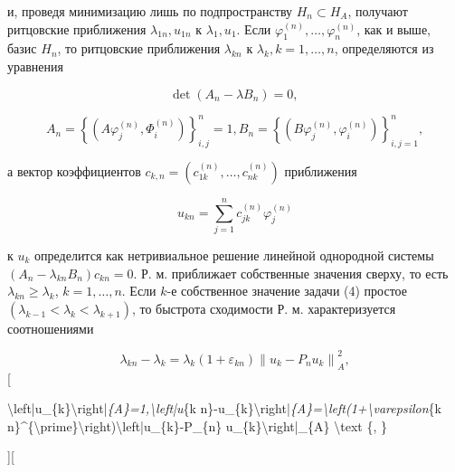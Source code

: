 \documentclass[10pt]{article}
\begin{document}
и, проведя минимизацию лишь по подпространству $H_{n} \subset H_{A}$, получают ритцовские приближения $\lambda_{1 n}, u_{1 n}$ к $\lambda_{1}, u_{1}$. Если $\varphi_{1}^{(n)}, \ldots, \varphi_{n}^{(n)}$, как и выше, базис $H_{n}$, то ритцовские приближения $\lambda_{k n}$ к $\lambda_{k}, k=1, \ldots, n$, определяются из уравнения



\[

\operatorname{det}\left(A_{n}-\lambda B_{n}\right)=0 \text {, }

\]



\[

A_{n}=\left\{\left(A \varphi_{j}^{(n)}, \Phi_{i}^{(n)}\right)\right\}_{i, j}^{n}=1, B_{n}=\left\{\left(B \varphi_{j}^{(n)}, \varphi_{i}^{(n)}\right)\right\}_{i, j=1}^{n},

\]



а вектор коэффициентов $c_{k, n}=\left(c_{1 k}^{(n)}, \ldots, c_{n k}^{(n)}\right)$ приближения



\[

u_{k n}=\sum_{j=1}^{n} c_{j k}^{(n)} \varphi_{j}^{(n)}

\]



к $u_{k}$ определится как нетривиальное решение линейной однородной системы $\left(A_{n}-\lambda_{k n} B_{n}\right) c_{k n}=0$. Р. м. приближает собственные значения сверху, то есть $\lambda_{k n} \geqslant \lambda_{k}$, $k=1, \ldots, n$. Если $k$-е собственное значение задачи (4) простое $\left(\lambda_{k-1}<\lambda_{k}<\lambda_{k+1}\right)$, то быстрота сходимости Р. м. характеризуется соотношениями



\[

\lambda_{k n}-\lambda_{k}=\lambda_{k}\left(1+\varepsilon_{k n}\right)\left\|u_{k}-P_{n} u_{k}\right\|_{A}^{2},

\][



\textbackslash left|u\_\{k\}\textbackslash right|\textit{\{A\}=1,\textbackslash left|u}\{k n\}-u\_\{k\}\textbackslash right|\textit{\{A\}=\textbackslash left(1+\textbackslash varepsilon}\{k n\}\^{}\{\textbackslash prime\}\textbackslash right)\textbackslash left|u\_\{k\}-P\_\{n\} u\_\{k\}\textbackslash right|\_\{A\} \textbackslash text \{, \}



][
\end{document}
